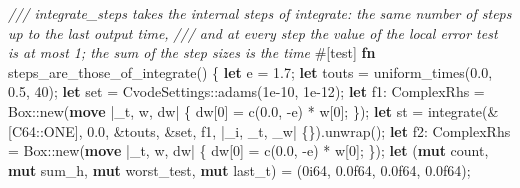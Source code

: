\documentclass[
  10pt,
]{article}
\newenvironment{Shaded}{}{}
\newcommand{\AttributeTok}[1]{\textcolor[rgb]{0.49,0.56,0.16}{#1}}
\newcommand{\CommentTok}[1]{\textcolor[rgb]{0.38,0.63,0.69}{\textit{#1}}}
\newcommand{\DataTypeTok}[1]{\textcolor[rgb]{0.56,0.13,0.00}{#1}}
\newcommand{\DecValTok}[1]{\textcolor[rgb]{0.25,0.63,0.44}{#1}}
\newcommand{\KeywordTok}[1]{\textcolor[rgb]{0.00,0.44,0.13}{\textbf{#1}}}
\newcommand{\NormalTok}[1]{#1}
\newcommand{\OperatorTok}[1]{\textcolor[rgb]{0.40,0.40,0.40}{#1}}
\newcommand{\PreprocessorTok}[1]{\textcolor[rgb]{0.74,0.48,0.00}{#1}}
\begin{document}
\begin{Shaded}
\begin{Highlighting}[]
    \CommentTok{/// \textasciigrave{}integrate\_steps\textasciigrave{} takes the internal steps of \textasciigrave{}integrate\textasciigrave{}: the same number of steps up to the last output time,}
    \CommentTok{/// and at every step the value of the local error test is at most 1; the sum of the step sizes is the time}
    \AttributeTok{\#[}\NormalTok{test}\AttributeTok{]}
    \KeywordTok{fn}\NormalTok{ steps\_are\_those\_of\_integrate() }\OperatorTok{\{}
        \KeywordTok{let}\NormalTok{ e }\OperatorTok{=} \DecValTok{1.7}\OperatorTok{;}
        \KeywordTok{let}\NormalTok{ touts }\OperatorTok{=}\NormalTok{ uniform\_times(}\DecValTok{0.0}\OperatorTok{,} \DecValTok{0.5}\OperatorTok{,} \DecValTok{40}\NormalTok{)}\OperatorTok{;}
        \KeywordTok{let}\NormalTok{ set }\OperatorTok{=} \PreprocessorTok{CvodeSettings::}\NormalTok{adams(}\DecValTok{1e{-}10}\OperatorTok{,} \DecValTok{1e{-}12}\NormalTok{)}\OperatorTok{;}
        \KeywordTok{let}\NormalTok{ f1}\OperatorTok{:}\NormalTok{ ComplexRhs }\OperatorTok{=} \DataTypeTok{Box}\PreprocessorTok{::}\NormalTok{new(}\KeywordTok{move} \OperatorTok{|}\NormalTok{\_t}\OperatorTok{,}\NormalTok{ w}\OperatorTok{,}\NormalTok{ dw}\OperatorTok{|} \OperatorTok{\{}
\NormalTok{            dw[}\DecValTok{0}\NormalTok{] }\OperatorTok{=}\NormalTok{ c(}\DecValTok{0.0}\OperatorTok{,} \OperatorTok{{-}}\NormalTok{e) }\OperatorTok{*}\NormalTok{ w[}\DecValTok{0}\NormalTok{]}\OperatorTok{;}
        \OperatorTok{\}}\NormalTok{)}\OperatorTok{;}
        \KeywordTok{let}\NormalTok{ st }\OperatorTok{=}\NormalTok{ integrate(}\OperatorTok{\&}\NormalTok{[}\PreprocessorTok{C64::}\NormalTok{ONE]}\OperatorTok{,} \DecValTok{0.0}\OperatorTok{,} \OperatorTok{\&}\NormalTok{touts}\OperatorTok{,} \OperatorTok{\&}\NormalTok{set}\OperatorTok{,}\NormalTok{ f1}\OperatorTok{,} \OperatorTok{|}\NormalTok{\_i}\OperatorTok{,}\NormalTok{ \_t}\OperatorTok{,}\NormalTok{ \_w}\OperatorTok{|} \OperatorTok{\{\}}\NormalTok{)}\OperatorTok{.}\NormalTok{unwrap()}\OperatorTok{;}
        \KeywordTok{let}\NormalTok{ f2}\OperatorTok{:}\NormalTok{ ComplexRhs }\OperatorTok{=} \DataTypeTok{Box}\PreprocessorTok{::}\NormalTok{new(}\KeywordTok{move} \OperatorTok{|}\NormalTok{\_t}\OperatorTok{,}\NormalTok{ w}\OperatorTok{,}\NormalTok{ dw}\OperatorTok{|} \OperatorTok{\{}
\NormalTok{            dw[}\DecValTok{0}\NormalTok{] }\OperatorTok{=}\NormalTok{ c(}\DecValTok{0.0}\OperatorTok{,} \OperatorTok{{-}}\NormalTok{e) }\OperatorTok{*}\NormalTok{ w[}\DecValTok{0}\NormalTok{]}\OperatorTok{;}
        \OperatorTok{\}}\NormalTok{)}\OperatorTok{;}
        \KeywordTok{let}\NormalTok{ (}\KeywordTok{mut}\NormalTok{ count}\OperatorTok{,} \KeywordTok{mut}\NormalTok{ sum\_h}\OperatorTok{,} \KeywordTok{mut}\NormalTok{ worst\_test}\OperatorTok{,} \KeywordTok{mut}\NormalTok{ last\_t) }\OperatorTok{=}\NormalTok{ (}\DecValTok{0i64}\OperatorTok{,} \DecValTok{0.0f64}\OperatorTok{,} \DecValTok{0.0f64}\OperatorTok{,} \DecValTok{0.0f64}\NormalTok{)}\OperatorTok{;}

\end{Highlighting}
\end{Shaded}
\end{document}
